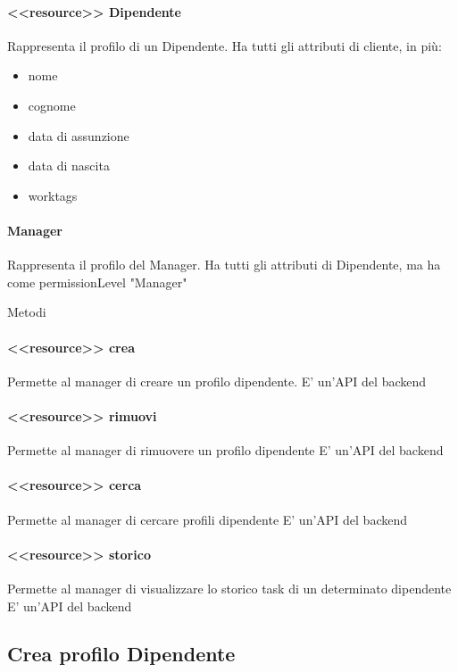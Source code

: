 \documentclass{report}
\begin{document}
\paragraph*{<<resource>> Dipendente}
Rappresenta il profilo di un Dipendente.
Ha tutti gli attributi di cliente, in più:
\begin{itemize}
	\item nome
	\item cognome
	\item data di assunzione
	\item data di nascita
	\item worktags
\end{itemize}
\paragraph*{Manager}
Rappresenta il profilo del Manager.
Ha tutti gli attributi di Dipendente, ma ha come permissionLevel "Manager"

Metodi
\paragraph*{<<resource>> crea}
Permette al manager di creare un profilo dipendente.
E' un'API del backend
\paragraph*{<<resource>> rimuovi}
Permette al manager di rimuovere un profilo dipendente
E' un'API del backend
\paragraph*{<<resource>> cerca}
Permette al manager di cercare profili dipendente
E' un'API del backend
\paragraph*{<<resource>> storico}
Permette al manager di visualizzare lo storico task di un determinato dipendente
E' un'API del backend

\subsection{Crea profilo Dipendente}
\end{document}
